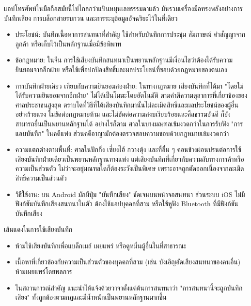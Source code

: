 


แอปโทรศัพท์ในมือถือสมัยนี้ไปไกลกว่าแป้นหมุนเลขธรรมดาแล้ว มันรวมเครื่องมือทรงพลังอย่างการบันทึกเสียง การบล็อกสายรบกวน และการระบุข้อมูลอัจฉริยะไว้ในที่เดียว


\begin{itemize}
  \item ประโยชน์: บันทึกเนื้อหาการสนทนาที่สำคัญ ใช้สำหรับบันทึกการประชุม สัมภาษณ์ คำสัญญาจากลูกค้า หรือเก็บไว้เป็นหลักฐานเมื่อมีข้อพิพาท
  \item ข้อกฎหมาย: ในจีน การใช้เสียงบันทึกสนทนาเป็นพยานหลักฐานมีเงื่อนไขว่าต้องได้รับความยินยอมจากอีกฝ่าย หรือใช้เพื่อปกป้องสิทธิ์และผลประโยชน์ที่ชอบด้วยกฎหมายของตนเอง
  \item การบันทึกฝ่ายเดียว เทียบกับความยินยอมสองฝ่าย: ในทางกฎหมาย เสียงบันทึกที่ได้มา "โดยไม่ได้รับความยินยอมจากอีกฝ่าย" ไม่ได้เป็นโมฆะโดยอัตโนมัติ ตามคำตีความตุลาการที่เกี่ยวข้องของศาลประชาชนสูงสุด ตราบใดที่วิธีที่ได้เสียงบันทึกมานั้นไม่ละเมิดสิทธิ์และผลประโยชน์ของผู้อื่นอย่างร้ายแรง ไม่ขัดต่อกฎหมายห้าม และไม่ขัดต่อความสงบเรียบร้อยและศีลธรรมอันดี ก็ยังสามารถยื่นเป็นพยานหลักฐานได้ อย่างไรก็ตาม ศาลในบางมณฑลเข้มงวดกว่าในการรับฟัง "การแอบบันทึก" ในคดีแพ่ง ส่วนคดีอาญามักต้องตรวจสอบความชอบด้วยกฎหมายเข้มงวดกว่า
  \item ความแตกต่างตามพื้นที่: ศาลในปักกิ่ง เซี่ยงไฮ้ กวางตุ้ง และที่อื่น ๆ ค่อนข้างผ่อนปรนต่อการใช้เสียงบันทึกฝ่ายเดียวเป็นพยานหลักฐานทางแพ่ง แต่เสียงบันทึกที่เกี่ยวกับความลับทางการค้าหรือความเป็นส่วนตัว ไม่ว่าจะอยู่มณฑลใดก็ต้องระวังเป็นพิเศษ เพราะอาจถูกตัดออกเนื่องจากละเมิดสิทธิ์ความเป็นส่วนตัว
  \item วิธีใช้งาน: บน Android มักมีปุ่ม "บันทึกเสียง" ชัดเจนบนหน้าจอสนทนา ส่วนระบบ iOS ไม่มีฟังก์ชันบันทึกเสียงสนทนาในตัว ต้องใช้แอปบุคคลที่สาม หรือใช้หูฟัง Bluetooth ที่มีฟังก์ชันบันทึกเสียง
\end{itemize}

\begin{tcbwarn}{เส้นแดงในการใช้เสียงบันทึก}
\begin{itemize}
  \item ห้ามใช้เสียงบันทึกเพื่อแบล็กเมล์ เผยแพร่ หรือดูหมิ่นผู้อื่นในที่สาธารณะ
  \item เนื้อหาที่เกี่ยวข้องกับความเป็นส่วนตัวของบุคคลที่สาม (เช่น บังเอิญอัดเสียงสนทนาของคนอื่น) ห้ามเผยแพร่โดยพลการ
  \item ในสถานการณ์สำคัญ แนะนำให้แจ้งด้วยวาจาตั้งแต่ต้นการสนทนาว่า "การสนทนานี้จะถูกบันทึกเสียง" ทั้งถูกต้องตามกฎและมีน้ำหนักเป็นพยานหลักฐานมากขึ้น
\end{itemize}

\end{tcbwarn}

